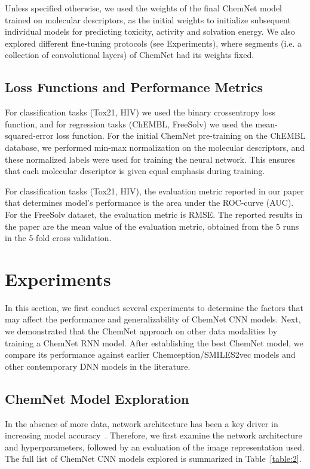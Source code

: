 \documentclass[sigconf]{acmart}
\begin{document}
Unless specified otherwise, we used the weights of the final ChemNet model trained on molecular descriptors, as the initial weights to initialize subsequent individual models for predicting toxicity, activity and solvation energy. We also explored different fine-tuning protocols (see Experiments), where segments (i.e. a collection of convolutional layers) of ChemNet had its weights fixed.

\subsection{Loss Functions and Performance Metrics}
For classification tasks (Tox21, HIV) we used the binary crossentropy loss function, and for regression tasks (ChEMBL, FreeSolv) we used the mean-squared-error loss function. For the initial ChemNet pre-training on the ChEMBL database, we performed min-max normalization on the molecular descriptors, and these normalized labels were used for training the neural network. This ensures that each molecular descriptor is given equal emphasis during training.

For classification tasks (Tox21, HIV), the evaluation metric reported in our paper that determines model's performance is the area under the ROC-curve (AUC). For the FreeSolv dataset, the evaluation metric is RMSE. The reported results in the paper are the mean value of the evaluation metric, obtained from the 5 runs in the 5-fold cross validation.

\section{Experiments}
\label{sec:exp} 

In this section, we first conduct several experiments to determine the factors that may affect the performance and generalizability of ChemNet CNN models. Next, we demonstrated that the ChemNet approach on other data modalities by training a ChemNet RNN model. After establishing the best ChemNet model, we compare its performance against earlier Chemception/SMILES2vec models and other contemporary DNN models in the literature. 

\subsection{ChemNet Model Exploration}
In the absence of more data, network architecture has been a key driver in increasing model accuracy~\cite{szegedy2015,he2015}. Therefore, we first examine the network architecture and hyperparameters, followed by an evaluation of the image representation used. The full list of ChemNet CNN models explored is summarized in Table~\ref{table:2}.
\end{document}
